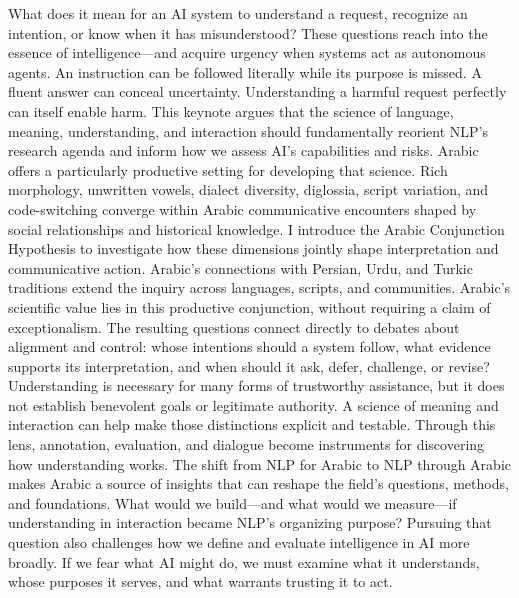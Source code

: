 What does it mean for an AI system to understand a request, recognize an intention, or know when it has misunderstood? These questions reach into the essence of intelligence—and acquire urgency when systems act as autonomous agents. An instruction can be followed literally while its purpose is missed. A fluent answer can conceal uncertainty. Understanding a harmful request perfectly can itself enable harm.
This keynote argues that the science of language, meaning, understanding, and interaction should fundamentally reorient NLP’s research agenda and inform how we assess AI’s capabilities and risks.
Arabic offers a particularly productive setting for developing that science. Rich morphology, unwritten vowels, dialect diversity, diglossia, script variation, and code-switching converge within Arabic communicative encounters shaped by social relationships and historical knowledge. I introduce the Arabic Conjunction Hypothesis to investigate how these dimensions jointly shape interpretation and communicative action. Arabic’s connections with Persian, Urdu, and Turkic traditions extend the inquiry across languages, scripts, and communities. Arabic’s scientific value lies in this productive conjunction, without requiring a claim of exceptionalism.
The resulting questions connect directly to debates about alignment and control: whose intentions should a system follow, what evidence supports its interpretation, and when should it ask, defer, challenge, or revise? Understanding is necessary for many forms of trustworthy assistance, but it does not establish benevolent goals or legitimate authority. A science of meaning and interaction can help make those distinctions explicit and testable.
Through this lens, annotation, evaluation, and dialogue become instruments for discovering how understanding works. The shift from NLP for Arabic to NLP through Arabic makes Arabic a source of insights that can reshape the field’s questions, methods, and foundations. What would we build—and what would we measure—if understanding in interaction became NLP’s organizing purpose? Pursuing that question also challenges how we define and evaluate intelligence in AI more broadly.
If we fear what AI might do, we must examine what it understands, whose purposes it serves, and what warrants trusting it to act.